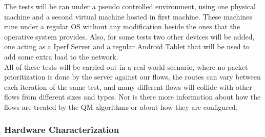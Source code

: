 The tests will be ran under a pseudo controlled environment, using one physical 
machine and a second virtual machine hosted in first machine. These machines 
runs under a regular OS without any modification beside the ones that the 
operative system provides. Also, for some tests two other devices will be added, 
one acting as a Iperf Server and a regular Android Tablet that will be used to 
add some extra load to the network.\\

All of these tests will be carried out in a real-world scenario, where no packet 
prioritization is done by the server against our flows, the routes can vary
between each iteration of the same test, and many different flows will collide
with other flows from different sizes and types. Nor is there more information 
about how the flows are treated by the QM algorithms or about how they are 
configured.\\


\subsubsection{Hardware Characterization}

